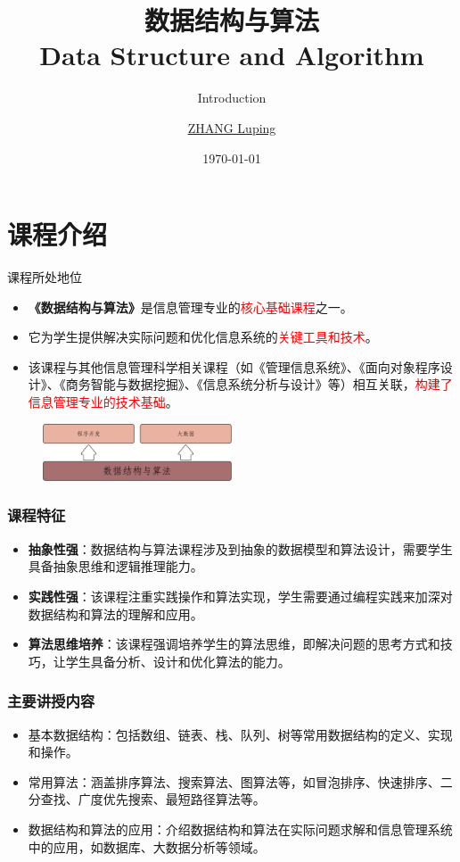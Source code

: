 \documentclass{sintefbeamer}
\title{数据结构与算法\\ Data Structure and Algorithm}
\subtitle{Introduction}
\author{\href{mailto:zlp@upc.edu.cn}{ZHANG Luping}}
\date{\today}
\begin{document}
\maketitle

\section{课程介绍}
\begin{frame}{课程所处地位}


  \begin{itemize}
    \item \textbf{《数据结构与算法》}是信息管理专业的\textcolor{red}{核心基础课程}之一。
    \item 它为学生提供解决实际问题和优化信息系统的\textcolor{red}{关键工具和技术}。
    \item 该课程与其他信息管理科学相关课程（如《管理信息系统》、《面向对象程序设计》、《商务智能与数据挖掘》、《信息系统分析与设计》等）相互关联，\textcolor{red}{构建了信息管理专业的技术基础}。
  \end{itemize}
  \begin{figure}
    \centering
    \includegraphics[width = 0.5\textwidth]{./images/import.pdf}
  \end{figure}


\end{frame}

\begin{frame}
  \frametitle{课程特征}

  \begin{itemize}
    \item \textbf{抽象性强}：数据结构与算法课程涉及到抽象的数据模型和算法设计，需要学生具备抽象思维和逻辑推理能力。
    \item \textbf{实践性强}：该课程注重实践操作和算法实现，学生需要通过编程实践来加深对数据结构和算法的理解和应用。
    \item \textbf{算法思维培养}：该课程强调培养学生的算法思维，即解决问题的思考方式和技巧，让学生具备分析、设计和优化算法的能力。
  \end{itemize}

\end{frame}

\begin{frame}
  \frametitle{主要讲授内容}

  \begin{itemize}
    \item 基本数据结构：包括数组、链表、栈、队列、树等常用数据结构的定义、实现和操作。
    \item 常用算法：涵盖排序算法、搜索算法、图算法等，如冒泡排序、快速排序、二分查找、广度优先搜索、最短路径算法等。
    \item 数据结构和算法的应用：介绍数据结构和算法在实际问题求解和信息管理系统中的应用，如数据库、大数据分析等领域。
  \end{itemize}

\end{frame}
\end{document}
